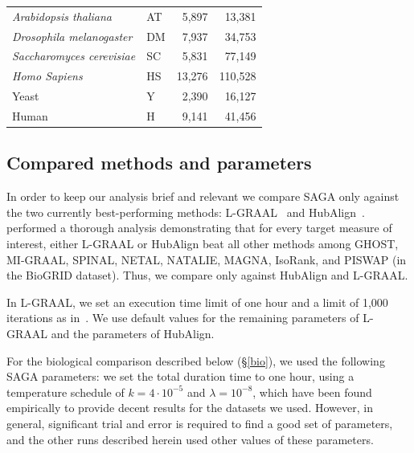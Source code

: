 \documentclass{bioinfo}
\begin{document}
\begin{table}[h]
\begin{tabular}{llrr}
\textit{Arabidopsis thaliana}      & AT                  & 5,897                                 & 13,381                                    \\
\textit{Drosophila melanogaster}   & DM                  & 7,937                                 & 34,753                                    \\
\textit{Saccharomyces cerevisiae}      & SC                  & 5,831                                 & 77,149                                    \\
\textit{Homo Sapiens}   & HS                  & 13,276                                 & 110,528                                   \\ \hline
Yeast                              & Y                   & 2,390                                 & 16,127                                    \\
Human                              & H                   & 9,141                                 & 41,456                                    \\ \hline
\end{tabular}
\end{table}

\subsection{Compared methods and parameters}

In order to keep our analysis brief and relevant we compare SAGA only against the two currently best-performing methods: L-GRAAL~\citep{LGRAAL} and HubAlign~\citep{HubAlign}. \cite{LGRAAL} performed a thorough analysis demonstrating that for every target measure of interest, either L-GRAAL or HubAlign beat all other methods among GHOST, MI-GRAAL, SPINAL, NETAL, NATALIE, MAGNA, IsoRank, and PISWAP (in the BioGRID dataset). Thus, we compare only against HubAlign and L-GRAAL.

In L-GRAAL, we set an execution time limit of one hour and a limit of 1,000 iterations as in~\citep{LGRAAL}. We use default values for the remaining parameters of L-GRAAL and the parameters of HubAlign.

For the biological comparison described below (\S \ref{bio}), we used the following SAGA parameters: we set the total duration time to one hour, using 
a temperature schedule of $k=4\cdot 10^{-5}$ and $\lambda=10^{-8}$, which have been found empirically to provide decent results for the datasets we used. However, in general, significant trial and error is required to find a good set of parameters, and the other runs described herein used other values of these parameters. %
\end{document}
